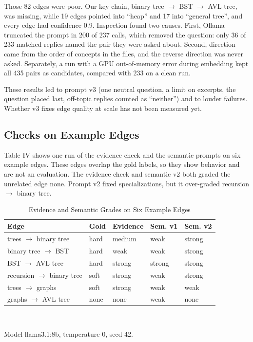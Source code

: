 \documentclass[conference]{IEEEtran}
\begin{document}
Those 82 edges were poor. Our key chain, binary tree $\rightarrow$ BST $\rightarrow$ AVL tree, was missing, while 19 edges pointed into ``heap'' and 17 into ``general tree'', and every edge had confidence 0.9. Inspection found two causes. First, Ollama truncated the prompt in 200 of 237 calls, which removed the question: only 36 of 233 matched replies named the pair they were asked about. Second, direction came from the order of concepts in the files, and the reverse direction was never asked. Separately, a run with a GPU out-of-memory error during embedding kept all 435 pairs as candidates, compared with 233 on a clean run.

These results led to prompt v3 (one neutral question, a limit on excerpts, the question placed last, off-topic replies counted as ``neither'') and to louder failures. Whether v3 fixes edge quality at scale has not been measured yet.

\subsection{Checks on Example Edges}
Table IV shows one run of the evidence check and the semantic prompts on six example edges. These edges overlap the gold labels, so they show behavior and are not an evaluation. The evidence check and semantic v2 both graded the unrelated edge none. Prompt v2 fixed specializations, but it over-graded recursion $\rightarrow$ binary tree.

\begin{table}[!t]
\caption{Evidence and Semantic Grades on Six Example Edges}
\centering\footnotesize
\begin{tabular}{@{}p{}p{}p{}p{}p{}@{}}
\toprule
\textbf{Edge} & \textbf{Gold} & \textbf{Evidence} & \textbf{Sem. v1} & \textbf{Sem. v2} \\ \midrule
trees $\rightarrow$ binary tree & hard & medium & weak & strong \\
binary tree $\rightarrow$ BST & hard & weak & weak & strong \\
BST $\rightarrow$ AVL tree & hard & strong & strong & strong \\
recursion $\rightarrow$ binary tree & soft & strong & weak & strong \\
trees $\rightarrow$ graphs & soft & strong & weak & weak \\
graphs $\rightarrow$ AVL tree & none & none & weak & none \\
\bottomrule
\end{tabular}
\\[2pt]\parbox{0.95\columnwidth}{\scriptsize Model llama3.1:8b, temperature 0, seed 42.}
\end{table}
\end{document}
